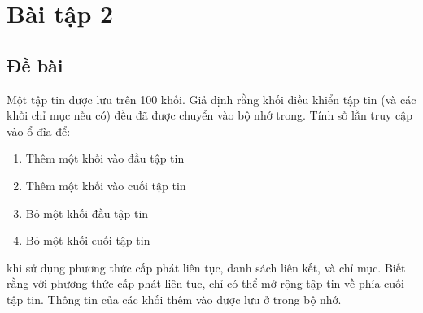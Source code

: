 \documentclass[12pt, letterpaper]{article}
\begin{document}
\section{Bài tập 2}
\subsection{Đề bài}
Một tập tin được lưu trên 100 khối. Giả định rằng khối điều
khiển tập tin (và các khối chỉ mục nếu có) đều đã được
chuyển vào bộ nhớ trong. Tính số lần truy cập vào ổ đĩa để:
\begin{enumerate}[label=\alph*)]
    \item Thêm một khối vào đầu tập tin
    \item Thêm một khối vào cuối tập tin
    \item Bỏ một khối đầu tập tin
    \item Bỏ một khối cuối tập tin
\end{enumerate}
khi sử dụng phương thức cấp phát liên tục, danh sách liên
kết, và chỉ mục. Biết rằng với phương thức cấp phát liên tục,
chỉ có thể mở rộng tập tin về phía cuối tập tin. Thông tin của
các khối thêm vào được lưu ở trong bộ nhớ.
\end{document}
